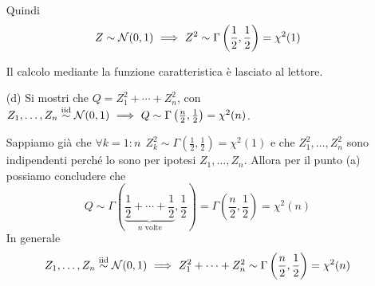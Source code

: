 \begin{enumerate}
Quindi
\[
Z\sim\mathcal{N}(0,1)\ \Longrightarrow\  Z^2\sim\Gamma\left(\frac{1}{2},\frac{1}{2}\right)=\chi^2(1)
\]
\begin{oss}
Il calcolo mediante la funzione caratteristica è lasciato al lettore.
\end{oss}

\item [(d)] Si mostri che $Q=Z_1^2+\cdots+Z_n^2$, con $Z_1,\dots,Z_n\stackrel{\mathrm{iid}}{\sim}\mathcal{N}(0,1)\ \Longrightarrow\  Q\sim\Gamma\left(\frac{n}{2},\frac{1}{2}\right)=\chi^2(n)$.

Sappiamo già che $\forall k=1:n\ \ Z_k^2\sim\Gamma\left(\frac{1}{2},\frac{1}{2}\right)=\chi^2(1)$ e che $Z_1^2,\dots,Z_n^2$ sono indipendenti perché lo sono per ipotesi $Z_1,\dots,Z_n$. Allora per il punto (a) possiamo concludere che
\[
Q\sim\Gamma\left(\underbrace{\frac{1}{2}+\cdots+\frac{1}{2}}_{n\text{ volte}}, \frac{1}{2}  \right)=\Gamma\left(  \frac{n}{2},\frac{1}{2} \right)=\chi^2(n)
\]
In generale
\[
Z_1,\dots,Z_n\stackrel{\mathrm{iid}}{\sim}\mathcal{N}(0,1)\ \Longrightarrow\  Z_1^2+\cdots+Z_n^2\sim\Gamma\left(\frac{n}{2},\frac{1}{2}\right)=\chi^2(n)
\]
\end{enumerate}

